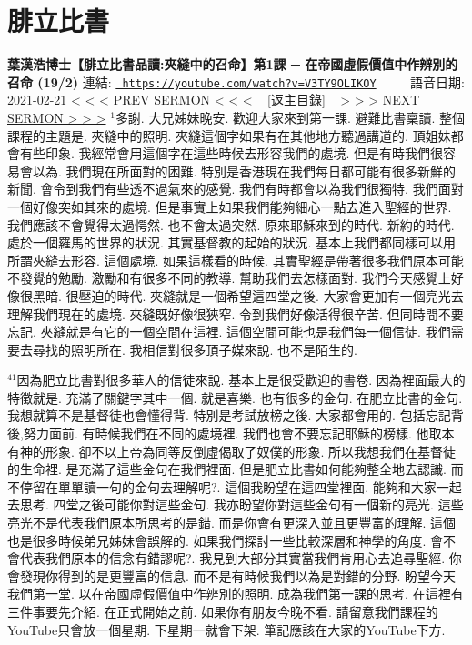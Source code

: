 \documentclass{book}
\begin{document}
\section{腓立比書}
\label{sec:V3TY9OLIKOY}
\textbf{葉漢浩博士【腓立比書品讀:夾縫中的召命】第1課 ─ 在帝國虛假價值中作辨別的召命 (19/2)}
\newline
\newline
連結: \href{https://youtube.com/watch?v=V3TY9OLIKOY}{\texttt{ https://youtube.com/watch?v=V3TY9OLIKOY}} ~~~~ 語音日期: 2021-02-21 
\newline
\newline
\hyperref[sec:ppW_QhbWCCE]{\small{< < < PREV SERMON < < <}}
~
\hyperref[sec:index]{\small{[返主目錄]}}
~
\hyperref[sec:mVawzgk9_PE]{\small{> > > NEXT SERMON > > >}}
\newline
\newline
$^{1}$多謝.
大兄姊妹晚安.
歡迎大家來到第一課.
避難比書稟讀.
整個課程的主題是.
夾縫中的照明.
夾縫這個字如果有在其他地方聽過講道的.
頂姐妹都會有些印象.
我經常會用這個字在這些時候去形容我們的處境.
但是有時我們很容易會以為.
我們現在所面對的困難.
特別是香港現在我們每日都可能有很多新鮮的新聞.
會令到我們有些透不過氣來的感覺.
我們有時都會以為我們很獨特.
我們面對一個好像突如其來的處境.
但是事實上如果我們能夠細心一點去進入聖經的世界.
我們應該不會覺得太過愕然.
也不會太過突然.
原來耶穌來到的時代.
新約的時代.
處於一個羅馬的世界的狀況.
其實基督教的起始的狀況.
基本上我們都同樣可以用所謂夾縫去形容.
這個處境.
如果這樣看的時候.
其實聖經是帶著很多我們原本可能不發覺的勉勵.
激勵和有很多不同的教導.
幫助我們去怎樣面對.
我們今天感覺上好像很黑暗.
很壓迫的時代.
夾縫就是一個希望這四堂之後.
大家會更加有一個亮光去理解我們現在的處境.
夾縫既好像很狹窄.
令到我們好像活得很辛苦.
但同時間不要忘記.
夾縫就是有它的一個空間在這裡.
這個空間可能也是我們每一個信徒.
我們需要去尋找的照明所在.
我相信對很多頂子媒來說.
也不是陌生的.

$^{41}$因為肥立比書對很多華人的信徒來說.
基本上是很受歡迎的書卷.
因為裡面最大的特徵就是.
充滿了關鍵字其中一個.
就是喜樂.
也有很多的金句.
在肥立比書的金句.
我想就算不是基督徒也會懂得背.
特別是考試放榜之後.
大家都會用的.
包括忘記背後,努力面前.
有時候我們在不同的處境裡.
我們也會不要忘記耶穌的榜樣.
他取本有神的形象.
卻不以上帝為同等反倒虛偈取了奴僕的形象.
所以我想我們在基督徒的生命裡.
是充滿了這些金句在我們裡面.
但是肥立比書如何能夠整全地去認識.
而不停留在單單讀一句的金句去理解呢?.
這個我盼望在這四堂裡面.
能夠和大家一起去思考.
四堂之後可能你對這些金句.
我亦盼望你對這些金句有一個新的亮光.
這些亮光不是代表我們原本所思考的是錯.
而是你會有更深入並且更豐富的理解.
這個也是很多時候弟兄姊妹會誤解的.
如果我們探討一些比較深層和神學的角度.
會不會代表我們原本的信念有錯謬呢?.
我見到大部分其實當我們肯用心去追尋聖經.
你會發現你得到的是更豐富的信息.
而不是有時候我們以為是對錯的分野.
盼望今天我們第一堂.
以在帝國虛假價值中作辨別的照明.
成為我們第一課的思考.
在這裡有三件事要先介紹.
在正式開始之前.
如果你有朋友今晚不看.
請留意我們課程的YouTube只會放一個星期.
下星期一就會下架.
筆記應該在大家的YouTube下方.
\end{document}
